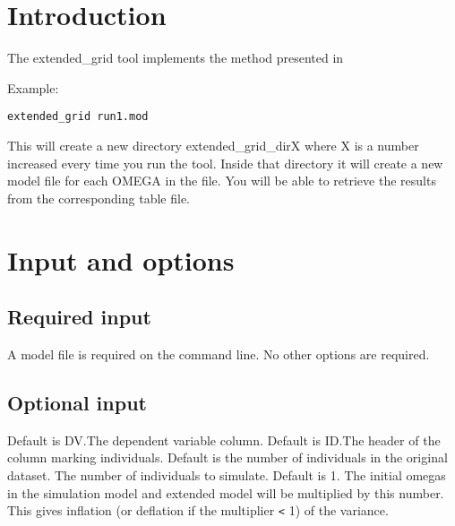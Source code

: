 




\maketitle
\newcommand{\guidetoolname}{extended\_grid}


\section{Introduction}
The extended\_grid tool implements the method presented in \cite{Savic}

Example:
\begin{verbatim}
extended_grid run1.mod
\end{verbatim}

This will create a new directory extended\_grid\_dirX where X is a number increased every time you run the tool. Inside that
directory it will create a new model file for each OMEGA in the file. You will be able to retrieve the results from the
corresponding table file.

\section{Input and options}

\subsection{Required input}
A model file is required on the command line. No other options are required.
	
\subsection{Optional input}	
\begin{optionlist}
Default is DV.The dependent variable column.  
\nextopt
{}
Default is ID.The header of the column marking individuals. 
\nextopt
{}
Default is the number of individuals in the original dataset. The number of individuals to simulate.  
\nextopt
{}
Default is 1. The initial omegas in the simulation model and extended model will be multiplied by this number. This gives inflation (or deflation if the multiplier \verb|<| 1) of the variance.
\nextopt
\end{optionlist}

